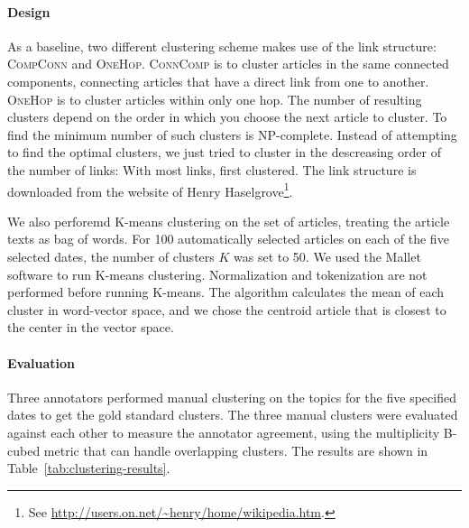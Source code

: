 \documentclass[11pt]{article}
\begin{document}
\paragraph{Design}
As a baseline, two different clustering scheme makes use of the link structure: \textsc{CompConn} and \textsc{OneHop}.
\textsc{ConnComp} is to cluster articles in the same connected components, connecting articles that have a direct link from one to another.
\textsc{OneHop} is to cluster articles within only one hop.
The number of resulting clusters depend on the order in which you choose the next article to cluster.
To find the minimum number of such clusters is NP-complete.
Instead of attempting to find the optimal clusters,
we just tried to cluster in the descreasing order of the number of links: With most links, first clustered.
The link structure is downloaded from the website of Henry Haselgrove\footnote{See \url{http://users.on.net/~henry/home/wikipedia.htm}.}.

We also perforemd K-means clustering on the set of articles, treating the article texts as bag of words.
For 100 automatically selected articles on each of the five selected dates,
the number of clusters $K$ was set to 50.
We used the Mallet \cite{McCallumMALLET} software to run K-means clustering.
Normalization and tokenization are not performed before running K-means.
The algorithm calculates the mean of each cluster in word-vector space,
and we chose the centroid article that is closest to the center in the vector space.

\paragraph{Evaluation}
Three annotators performed manual clustering on the topics for the five specified dates to get the gold standard clusters.
The three manual clusters were evaluated against each other to measure the annotator agreement,
using the multiplicity B-cubed metric \cite{amigo09} that can handle overlapping clusters.
The results are shown in Table~\ref{tab:clustering-results}.
\end{document}
